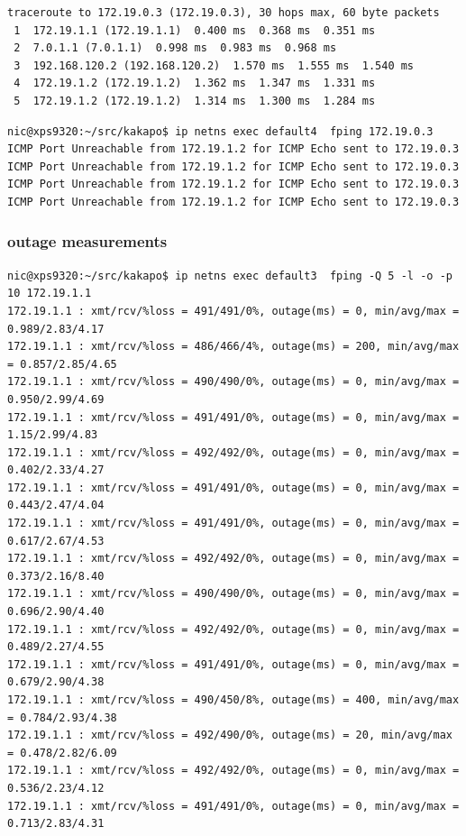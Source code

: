 \begin{lstlisting}[title=traceroute report when the adverse route is not mitigated]
traceroute to 172.19.0.3 (172.19.0.3), 30 hops max, 60 byte packets
 1  172.19.1.1 (172.19.1.1)  0.400 ms  0.368 ms  0.351 ms
 2  7.0.1.1 (7.0.1.1)  0.998 ms  0.983 ms  0.968 ms
 3  192.168.120.2 (192.168.120.2)  1.570 ms  1.555 ms  1.540 ms
 4  172.19.1.2 (172.19.1.2)  1.362 ms  1.347 ms  1.331 ms
 5  172.19.1.2 (172.19.1.2)  1.314 ms  1.300 ms  1.284 ms
\end{lstlisting}

\begin{lstlisting}
nic@xps9320:~/src/kakapo$ ip netns exec default4  fping 172.19.0.3
ICMP Port Unreachable from 172.19.1.2 for ICMP Echo sent to 172.19.0.3
ICMP Port Unreachable from 172.19.1.2 for ICMP Echo sent to 172.19.0.3
ICMP Port Unreachable from 172.19.1.2 for ICMP Echo sent to 172.19.0.3
ICMP Port Unreachable from 172.19.1.2 for ICMP Echo sent to 172.19.0.3
\end{lstlisting}


\subsubsection{outage measurements}

\begin{lstlisting}[title=fping reported outages at 5 second intervals]
nic@xps9320:~/src/kakapo$ ip netns exec default3  fping -Q 5 -l -o -p 10 172.19.1.1
172.19.1.1 : xmt/rcv/%loss = 491/491/0%, outage(ms) = 0, min/avg/max = 0.989/2.83/4.17
172.19.1.1 : xmt/rcv/%loss = 486/466/4%, outage(ms) = 200, min/avg/max = 0.857/2.85/4.65
172.19.1.1 : xmt/rcv/%loss = 490/490/0%, outage(ms) = 0, min/avg/max = 0.950/2.99/4.69
172.19.1.1 : xmt/rcv/%loss = 491/491/0%, outage(ms) = 0, min/avg/max = 1.15/2.99/4.83
172.19.1.1 : xmt/rcv/%loss = 492/492/0%, outage(ms) = 0, min/avg/max = 0.402/2.33/4.27
172.19.1.1 : xmt/rcv/%loss = 491/491/0%, outage(ms) = 0, min/avg/max = 0.443/2.47/4.04
172.19.1.1 : xmt/rcv/%loss = 491/491/0%, outage(ms) = 0, min/avg/max = 0.617/2.67/4.53
172.19.1.1 : xmt/rcv/%loss = 492/492/0%, outage(ms) = 0, min/avg/max = 0.373/2.16/8.40
172.19.1.1 : xmt/rcv/%loss = 490/490/0%, outage(ms) = 0, min/avg/max = 0.696/2.90/4.40
172.19.1.1 : xmt/rcv/%loss = 492/492/0%, outage(ms) = 0, min/avg/max = 0.489/2.27/4.55
172.19.1.1 : xmt/rcv/%loss = 491/491/0%, outage(ms) = 0, min/avg/max = 0.679/2.90/4.38
172.19.1.1 : xmt/rcv/%loss = 490/450/8%, outage(ms) = 400, min/avg/max = 0.784/2.93/4.38
172.19.1.1 : xmt/rcv/%loss = 492/490/0%, outage(ms) = 20, min/avg/max = 0.478/2.82/6.09
172.19.1.1 : xmt/rcv/%loss = 492/492/0%, outage(ms) = 0, min/avg/max = 0.536/2.23/4.12
172.19.1.1 : xmt/rcv/%loss = 491/491/0%, outage(ms) = 0, min/avg/max = 0.713/2.83/4.31
\end{lstlisting}

